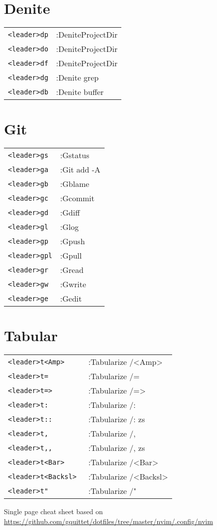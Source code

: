 \begin{multicols}{3}
\section{Denite}
\begin{tabular}{@{}ll@{}}
	\verb!<leader>dp! & :DeniteProjectDir \\
	\verb!<leader>do! & :DeniteProjectDir \\
	\verb!<leader>df! & :DeniteProjectDir \\
	\verb!<leader>dg! & :Denite grep \\
	\verb!<leader>db! & :Denite buffer \\
\end{tabular}

\section{Git}
\begin{tabular}{@{}ll@{}}
	\verb!<leader>gs! & :Gstatus \\
	\verb!<leader>ga! & :Git add -A \\
	\verb!<leader>gb! & :Gblame \\
	\verb!<leader>gc! & :Gcommit \\
	\verb!<leader>gd! & :Gdiff \\
	\verb!<leader>gl! & :Glog \\
	\verb!<leader>gp! & :Gpush \\
	\verb!<leader>gpl! & :Gpull  \\
	\verb!<leader>gr! & :Gread \\
	\verb!<leader>gw! & :Gwrite \\
	\verb!<leader>ge! & :Gedit \\
\end{tabular}

\section{Tabular}
\begin{tabular}{@{}ll@{}}
	\verb!<leader>t<Amp> ! & :Tabularize  /<Amp> \\
	\verb!<leader>t= ! & :Tabularize  /= \\
	\verb!<leader>t=>! & :Tabularize  /=> \\
	\verb!<leader>t: ! & :Tabularize  /: \\
	\verb!<leader>t::! & :Tabularize  /: zs \\
	\verb!<leader>t, ! & :Tabularize  /, \\
	\verb!<leader>t,,! & :Tabularize  /, zs \\
	\verb!<leader>t<Bar>! & :Tabularize  /<Bar> \\
	\verb!<leader>t<Backsl> ! & :Tabularize  /<Backsl> \\
	\verb!<leader>t" ! & :Tabularize  /" \\
\end{tabular}

Single page cheat sheet based on \url{https://github.com/gquittet/dotfiles/tree/master/nvim/.config/nvim}

\end{multicols}

